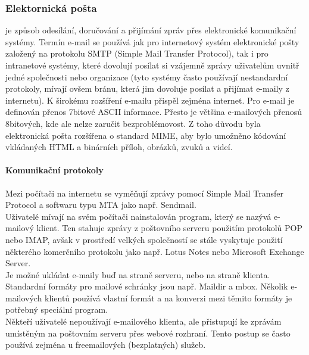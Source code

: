 \documentclass[10pt,a4paper]{article}
\begin{document}
\subsubsection{Elektornická pošta}
je způsob odesílání, doručování a přijímání zpráv přes elektronické komunikační systémy. Termín e-mail se používá jak pro internetový systém elektronické pošty založený na protokolu SMTP (Simple Mail Transfer Protocol), tak i pro intranetové systémy, které dovolují posílat si vzájemně zprávy uživatelům uvnitř jedné společnosti nebo organizace (tyto systémy často používají nestandardní protokoly, mívají ovšem bránu, která jim dovoluje posílat a přijímat e-maily z internetu). K širokému rozšíření e-mailu přispěl zejména internet.
Pro e-mail je definován přenos 7bitové ASCII informace. Přesto je většina e-mailových přenosů 8bitových, kde ale nelze zaručit bezproblémovost. Z toho důvodu byla elektronická pošta rozšířena o standard MIME, aby bylo umožněno kódování vkládaných HTML a binárních příloh, obrázků, zvuků a videí.
\paragraph{Komunikační protokoly} Mezi počítači na internetu se vyměňují zprávy pomocí Simple Mail Transfer Protocol a softwaru typu MTA jako např. Sendmail. \\
Uživatelé mívají na svém počítači nainstalován program, který se nazývá e-mailový klient. Ten stahuje zprávy z poštovního serveru použitím protokolů POP nebo IMAP, avšak v prostředí velkých společností se stále vyskytuje použití některého komerčního protokolu jako např. Lotus Notes nebo Microsoft Exchange Server. \\
Je možné ukládat e-maily buď na straně serveru, nebo na straně klienta. Standardní formáty pro mailové schránky jsou např. Maildir a mbox. Několik e-mailových klientů používá vlastní formát a na konverzi mezi těmito formáty je potřebný speciální program. \\
Někteří uživatelé nepoužívají e-mailového klienta, ale přistupují ke zprávám umístěným na poštovním serveru přes webové rozhraní. Tento postup se často používá zejména u freemailových (bezplatných) služeb.
\end{document}
